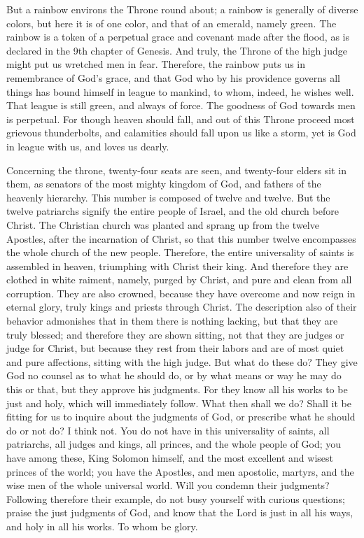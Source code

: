 But a rainbow environs the Throne round about; a rainbow is generally of diverse colors, but here it is of one color, and that of an emerald, namely green. The rainbow is a token of a perpetual grace and covenant made after the flood, as is declared in the 9th chapter of Genesis. And truly, the Throne of the high judge might put us wretched men in fear. Therefore, the rainbow puts us in remembrance of God’s grace, and that God who by his providence governs all things has bound himself in league to mankind, to whom, indeed, he wishes well. That league is still green, and always of force. The goodness of God towards men is perpetual. For though heaven should fall, and out of this Throne proceed most grievous thunderbolts, and calamities should fall upon us like a storm, yet is God in league with us, and loves us dearly.

Concerning the throne, twenty-four seats are seen, and twenty-four elders sit in them, as senators of the most mighty kingdom of God, and fathers of the heavenly hierarchy. This number is composed of twelve and twelve. But the twelve patriarchs signify the entire people of Israel, and the old church before Christ. The Christian church was planted and sprang up from the twelve Apostles, after the incarnation of Christ, so that this number twelve encompasses the whole church of the new people. Therefore, the entire universality of saints is assembled in heaven, triumphing with Christ their king. And therefore they are clothed in white raiment, namely, purged by Christ, and pure and clean from all corruption. They are also crowned, because they have overcome and now reign in eternal glory, truly kings and priests through Christ. The description also of their behavior admonishes that in them there is nothing lacking, but that they are truly blessed; and therefore they are shown sitting, not that they are judges or judge for Christ, but because they rest from their labors and are of most quiet and pure affections, sitting with the high judge. But what do these do? They give God no counsel as to what he should do, or by what means or way he may do this or that, but they approve his judgments. For they know all his works to be just and holy, which will immediately follow. What then shall we do? Shall it be fitting for us to inquire about the judgments of God, or prescribe what he should do or not do? I think not. You do not have in this universality of saints, all patriarchs, all judges and kings, all princes, and the whole people of God; you have among these, King Solomon himself, and the most excellent and wisest princes of the world; you have the Apostles, and men apostolic, martyrs, and the wise men of the whole universal world. Will you condemn their judgments? Following therefore their example, do not busy yourself with curious questions; praise the just judgments of God, and know that the Lord is just in all his ways, and holy in all his works. To whom be glory.
